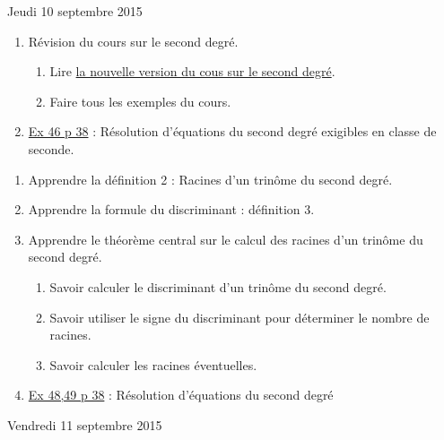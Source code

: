 \documentclass[a4paper,11pt]{article}
\theoremstyle{break}
\begin{document}
  Jeudi 10 septembre 2015
  
  \begin{enumerate}
    \item Révision du cours sur le second degré.
    \begin{enumerate}
      \item Lire 
      \href{https://github.com/mathlorgues/math1sd1516/blob/master/Chapitres/Chapitre1/presentations/secondDegre.pdf}
      {la nouvelle version du cous sur le second degré}. 
      \item Faire tous les exemples du cours.
    \end{enumerate}
    \item  
    \href{https://github.com/mathlorgues/math1sd1516/blob/master/images/46p38.jpg}
    {Ex 46 p 38} : Résolution d'équations du second degré exigibles en classe de seconde.
   
  \end{enumerate}


  
  
   \begin{Dev}
    
    \begin{enumerate}
      
      \item Apprendre la définition 2 : Racines d'un trinôme du second degré.
      \item Apprendre la formule du discriminant : définition 3.
      \item Apprendre le théorème central sur le calcul des racines 
      d'un trinôme du second degré.
      \begin{enumerate}
	\item Savoir calculer le discriminant d'un trinôme du second degré. 
	\item Savoir utiliser le signe du discriminant pour déterminer
	le nombre de racines.
	\item Savoir calculer les racines éventuelles.
      \end{enumerate}
      \item  
      \href{https://github.com/mathlorgues/math1sd1516/blob/master/images/47-52p38.png}
      {Ex 48,49 p 38} : 
      Résolution d'équations du second degré
      
      
    \end{enumerate}
  \end{Dev}
  
  Vendredi 11 septembre 2015
  
\end{document}
